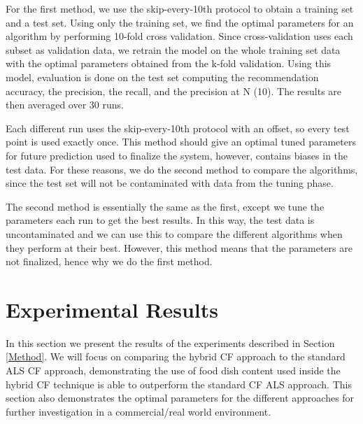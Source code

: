 For the first method, we use the skip-every-10th protocol to obtain a training set and a test set. Using only the training set, we find the optimal parameters for an algorithm by performing 10-fold cross validation. Since cross-validation uses each subset as validation data, we retrain the model on the whole training set data with the optimal parameters obtained from the k-fold validation. Using this model, evaluation is done on the test set computing the recommendation accuracy, the precision, the recall, and the precision at N (10). The results are then averaged over 30 runs. 

 Each different run uses the skip-every-10th protocol with an offset, so every test point is used exactly once. This method should give an optimal tuned parameters for future prediction used to finalize the system, however, contains biases in the test data. For these reasons, we do the second method to compare the algorithms, since the test set will not be contaminated with data from the tuning phase.

The second method is essentially the same as the first, except we tune the parameters each run to get the best results. In this way, the test data is uncontaminated and we can use this to compare the different algorithms when they perform at their best. However, this method means that the parameters are not finalized, hence why we do the first method. 



\section{Experimental Results}

In this section we present the results of the experiments described in Section \ref{Method}. We will focus on comparing the hybrid CF approach to the standard ALS CF approach, demonstrating the use of food dish content used inside the hybrid CF technique is able to outperform the standard CF ALS approach. This section also demonstrates the optimal parameters for the different approaches for further investigation in a commercial/real world environment.  

